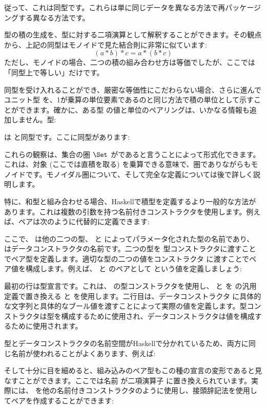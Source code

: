 従って、これは同型です。これらは単に同じデータを異なる方法で再パッケージングする異なる方法です。

型の積の生成を、型に対する二項演算として解釈することができます。その観点から、上記の同型はモノイドで見た結合則に非常に似ています: 
\[(a * b) * c = a * (b * c)\]
ただし、モノイドの場合、二つの積の組み合わせ方は等価でしたが、ここでは「同型上で等しい」だけです。

同型を受け入れることができ、厳密な等価性にこだわらない場合、さらに進んでユニット型 \code{()} を、1が乗算の単位要素であるのと同じ方法で積の単位として示すことができます。確かに、ある型  の値と単位のペアリングは、いかなる情報も追加しません。型: 

は  と同型です。ここに同型があります: 


これらの観察は、集合の圏 $\Set$ がであると言うことによって形式化できます。これは、対象 (ここでは直積を取る) を乗算できる意味で、圏でありながらもモノイドです。モノイダル圏について、そして完全な定義については後で詳しく説明します。

特に、和型と組み合わせる場合、Haskellで積型を定義するより一般的な方法があります。これは複数の引数を持つ名前付きコンストラクタを使用します。例えば、ペアは次のように代替的に定義できます: 

ここで、 は他の二つの型、 と  によってパラメータ化された型の名前であり、 はデータコンストラクタの名前です。二つの型を  型コンストラクタに渡すことでペア型を定義します。適切な型の二つの値をコンストラクタ  に渡すことでペア値を構成します。例えば、 と  のペアとして  という値を定義しましょう: 

最初の行は型宣言です。これは、 の型コンストラクタを使用し、 と  を  の汎用定義で置き換える  と  を使用します。二行目は、データコンストラクタ  に具体的な文字列と具体的なブール値を渡すことによって実際の値を定義します。型コンストラクタは型を構成するために使用され、データコンストラクタは値を構成するために使用されます。

型とデータコンストラクタの名前空間がHaskellで分かれているため、両方に同じ名前が使われることがよくあります、例えば: 

そして十分に目を細めると、組み込みのペア型もこの種の宣言の変形であると見なすことができます。ここでは名前  が二項演算子 \code{(,)} に置き換えられています。実際には、\code{(,)} を他の名前付きコンストラクタのように使用し、接頭辞記法を使用してペアを作成することができます: 

